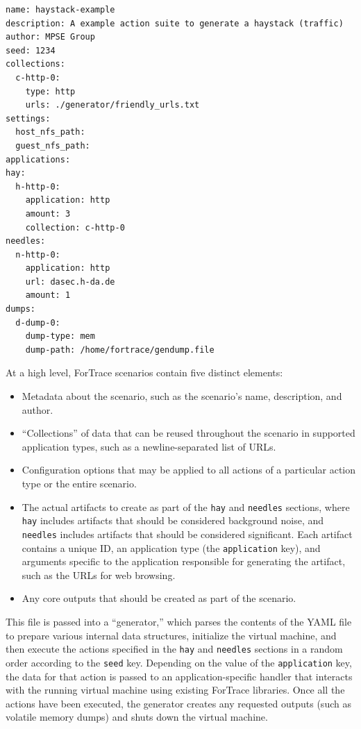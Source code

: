 \documentclass[letterpaper,12pt]{report}
\def\tightlist{}
\newcommand{\passthrough}[1]{#1}
\begin{document}
\begin{lstlisting}[label={lst:6.3.1a}, caption={Declarative ForTrace scenario with web browsing \cite{gobelForTraceHolisticForensic2022}}, ]
name: haystack-example
description: A example action suite to generate a haystack (traffic)
author: MPSE Group
seed: 1234
collections:
  c-http-0:
    type: http
    urls: ./generator/friendly_urls.txt
settings:
  host_nfs_path:
  guest_nfs_path:
applications:
hay:
  h-http-0:
    application: http
    amount: 3
    collection: c-http-0
needles:
  n-http-0:
    application: http
    url: dasec.h-da.de
    amount: 1
dumps:
  d-dump-0:
    dump-type: mem
    dump-path: /home/fortrace/gendump.file
\end{lstlisting}

At a high level, ForTrace scenarios contain five distinct elements:

\begin{itemize}
\tightlist
\item
  Metadata about the scenario, such as the scenario's name, description,
  and author.
\item
  ``Collections'' of data that can be reused throughout the scenario in
  supported application types, such as a newline-separated list of URLs.
\item
  Configuration options that may be applied to all actions of a
  particular action type or the entire scenario.
\item
  The actual artifacts to create as part of the
  \passthrough{\lstinline!hay!} and \passthrough{\lstinline!needles!}
  sections, where \passthrough{\lstinline!hay!} includes artifacts that
  should be considered background noise, and
  \passthrough{\lstinline!needles!} includes artifacts that should be
  considered significant. Each artifact contains a unique ID, an
  application type (the \passthrough{\lstinline!application!} key), and
  arguments specific to the application responsible for generating the
  artifact, such as the URLs for web browsing.
\item
  Any core outputs that should be created as part of the scenario.
\end{itemize}

This file is passed into a ``generator,'' which parses the contents of
the YAML file to prepare various internal data structures, initialize
the virtual machine, and then execute the actions specified in the
\passthrough{\lstinline!hay!} and \passthrough{\lstinline!needles!}
sections in a random order according to the
\passthrough{\lstinline!seed!} key. Depending on the value of the
\passthrough{\lstinline!application!} key, the data for that action is
passed to an application-specific handler that interacts with the
running virtual machine using existing ForTrace libraries. Once all the
actions have been executed, the generator creates any requested outputs
(such as volatile memory dumps) and shuts down the virtual machine.
\end{document}
